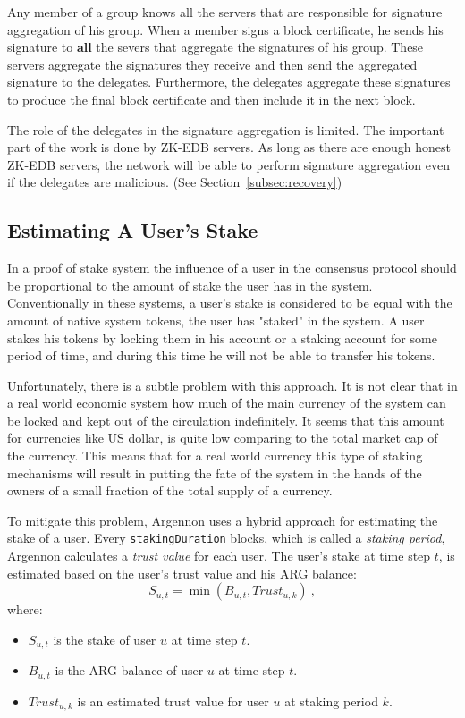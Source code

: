 Any member of a group knows all the servers that are responsible for signature aggregation of his group. When a member
signs a block certificate, he sends his signature to \textbf{all} the severs that aggregate the signatures of his group.
These servers aggregate the signatures they receive and then send the aggregated signature to the delegates.
Furthermore, the delegates aggregate these signatures to produce the final block certificate
and then include it in the next block.

The role of the delegates in the signature aggregation is limited. The important part of the work is done by ZK-EDB
servers. As long as there are enough honest ZK-EDB servers, the network will be able to perform signature aggregation
even if the delegates are malicious. (See Section~\ref{subsec:recovery})

\subsection{Estimating A User's Stake}\label{subsec:user's-stake}

In a proof of stake system the influence of a user in the consensus protocol should be proportional to the amount
of stake the user has in the system. Conventionally in these systems, a user's stake is considered to be equal with the
amount of native system tokens, the user has "staked" in the system. A user stakes his tokens by locking them in
his account or a staking account for some period of time, and during this time he will not be able to transfer
his tokens.

Unfortunately, there is a subtle problem with this approach. It is not clear that in a real world economic system
how much of the main currency of the system can be locked and kept out of the circulation indefinitely. It seems that
this amount for currencies like US dollar, is quite low comparing to the total market cap of the currency.
This means that for a real world currency this type of staking mechanisms will result in putting the
fate of the system in the hands of the owners of a small fraction of the total supply of a currency.

To mitigate this problem, Argennon uses a hybrid approach for estimating the stake of a user.
Every \texttt{stakingDuration} blocks, which is called a \emph{staking period}, Argennon calculates
a \emph{trust value} for each user. The user's stake
at time step \(t\), is estimated based on the user's trust value and his ARG balance:
\begin{equation}
    S_{u,t} = \min (B_{u,t}, Trust_{u,k})\ ,\label{eq:stake}
\end{equation}
where:
\begin{itemize}
    \item \(S_{u,t}\) is the stake of user \(u\) at time step \(t\).
    \item \(B_{u,t}\) is the ARG balance of user \(u\) at time step \(t\).
    \item \(Trust_{u,k}\) is an estimated trust value for user \(u\) at staking period \(k\).
\end{itemize}

